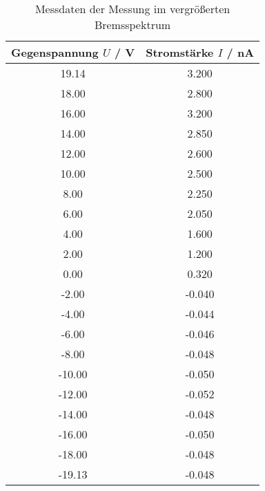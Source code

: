 \begin{table}[!htp]
\centering
\caption{Messdaten der Messung im vergrößerten Bremsspektrum}
\label{tab:messung2}
\begin{tabular}{c c}
\toprule
{Gegenspannung $U$ / V} & {Stromstärke $I$ / nA } \\
\midrule
19.14 & 3.200 \\
18.00 & 2.800 \\
16.00 & 3.200 \\
14.00 & 2.850 \\
12.00 & 2.600 \\
10.00 & 2.500 \\
8.00 & 2.250 \\
6.00 & 2.050 \\
4.00 & 1.600 \\
2.00 & 1.200 \\
0.00 & 0.320 \\
-2.00 & -0.040 \\
-4.00 & -0.044 \\
-6.00 & -0.046 \\
-8.00 & -0.048 \\
-10.00 & -0.050 \\
-12.00 & -0.052 \\
-14.00 & -0.048 \\
-16.00 & -0.050 \\
-18.00 & -0.048 \\
-19.13 & -0.048 \\
\bottomrule
\end{tabular}
\end{table}